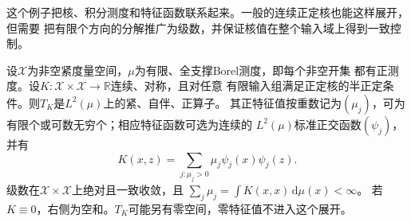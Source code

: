 这个例子把核、积分测度和特征函数联系起来。一般的连续正定核也能这样展开，但需要
把有限个方向的分解推广为级数，并保证核值在整个输入域上得到一致控制。
\begin{theorem}[连续正定核的Mercer展开]
\label{thm:functional-mercer}
设$\mathcal{X}$为非空紧度量空间，$\mu$为有限、全支撑Borel测度，即每个非空开集
都有正测度。设$K:\mathcal{X}\times\mathcal{X}\to\mathbb{R}$连续、对称，且对任意
有限输入组满足正定核的半正定条件。则$T_K$是$L^2(\mu)$上的紧、自伴、正算子。
其正特征值按重数记为$(\mu_j)$，可为有限个或可数无穷个；相应特征函数可选为连续的
$L^2(\mu)$标准正交函数$(\psi_j)$，并有
\begin{equation}
 K(x,z)=\sum_{j:\mu_j>0}\mu_j\psi_j(x)\psi_j(z).
 \label{eq:functional-mercer-expansion}
\end{equation}
级数在$\mathcal{X}\times\mathcal{X}$上绝对且一致收敛，且
$\sum_j\mu_j=\int K(x,x)\,\mathrm d\mu(x)<\infty$。
若$K\equiv0$，右侧为空和。$T_K$可能另有零空间，零特征值不进入这个展开。
\end{theorem}

